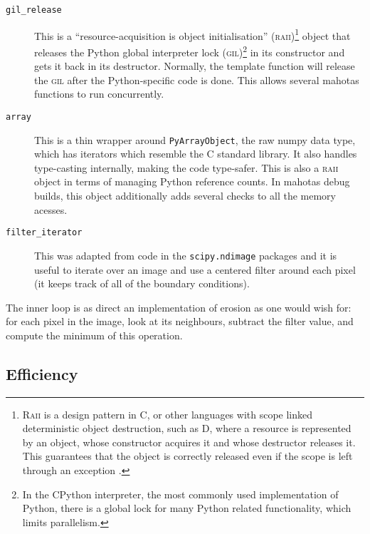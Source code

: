 \documentclass{scrartcl}
\newcommand*{\cpp}{{C\nolinebreak[4]\hspace{-.05em}\raisebox{.4ex}{\tiny\textbf{++}}}}
\let\code\texttt
\begin{document}
\begin{description}
\item[\code{gil\_release}] This is a ``resource-acquisition is object
initialisation'' (\textsc{raii})\footnote{\textsc{Raii} is a design pattern in
\cpp{}, or other languages with scope linked deterministic object destruction,
such as D, where a resource is represented by an object, whose constructor
acquires it and whose destructor releases it. This guarantees that the object
is correctly released even if the scope is left through an exception
\citep{Stroustrup1994}.} object that releases the Python global interpreter lock
(\textsc{gil})\footnote{In the CPython interpreter, the most commonly used
implementation of Python, there is a global lock for many Python related
functionality, which limits parallelism.} in its constructor and gets it back
in its destructor. Normally, the template function will release the
\textsc{gil} after the Python-specific code is done. This allows several
mahotas functions to run concurrently.
\item[\code{array}] This is a thin wrapper around \code{PyArrayObject}, the raw
numpy data type, which has iterators which resemble the \cpp{} standard
library. It also handles type-casting internally, making the code type-safer.
This is also a \textsc{raii} object in terms of managing Python reference
counts. In mahotas debug builds, this object additionally adds several checks
to all the memory acesses.
\item[\code{filter\_iterator}] This was adapted from code in the
\code{scipy.ndimage} packages and it is useful to iterate over an image and use
a centered filter around each pixel (it keeps track of all of the boundary
conditions).
\end{description}

The inner loop is as direct an implementation of erosion as one would wish for:
for each pixel in the image, look at its neighbours, subtract the filter value,
and compute the minimum of this operation.

\subsection{Efficiency}
\end{document}

